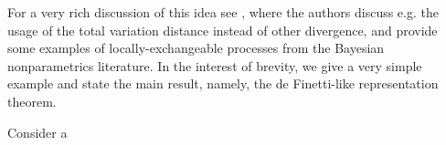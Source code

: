For a very rich discussion of this idea see \cite{CampbellEtAl:2019:LocalExch}, where the authors discuss e.g. the usage of the total variation distance instead of other divergence, and provide some examples of locally-exchangeable processes from the Bayesian nonparametrics literature. In the interest of brevity, we give a very simple example and state the main result, namely, the de Finetti-like representation theorem.



\begin{mdframed}[backgroundcolor=mygray] 
	\begin{example} 
		Consider a
	\end{example}
\end{mdframed}




